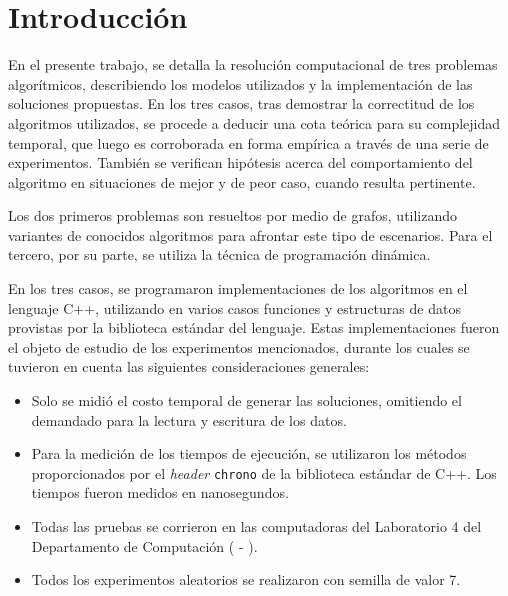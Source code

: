\section{Introducción}
    En el presente trabajo, se detalla la resolución computacional de tres
    problemas algorítmicos, describiendo los modelos utilizados y la
    implementación de las soluciones propuestas. En los tres casos, tras
    demostrar la correctitud de los algoritmos utilizados, se procede a
    deducir una cota teórica para su complejidad temporal, que luego es
    corroborada en forma empírica a través de una serie de experimentos.
    También se verifican hipótesis acerca del comportamiento del algoritmo
    en situaciones de mejor y de peor caso, cuando resulta pertinente.

    Los dos primeros problemas son resueltos por medio de grafos, utilizando
    variantes de conocidos algoritmos para afrontar este tipo de escenarios.
    Para el tercero, por su parte, se utiliza la técnica de programación
    dinámica.

    En los tres casos, se programaron implementaciones de los algoritmos
    en el lenguaje C++, utilizando en varios casos funciones y
    estructuras de datos provistas por la biblioteca estándar del lenguaje.
    Estas implementaciones fueron el objeto de estudio de los experimentos
    mencionados, durante los cuales se tuvieron en cuenta las siguientes
    consideraciones generales:

    \begin{itemize}
    \item Solo se midió el costo temporal de generar las soluciones,
    omitiendo el demandado para la lectura y escritura de los datos.
    \item Para la medición de los tiempos de ejecución, se utilizaron los
    métodos proporcionados por el \emph{header} \texttt{chrono} de la
    biblioteca estándar de C++. Los tiempos fueron medidos en nanosegundos.
    \item Todas las pruebas se corrieron en las computadoras del Laboratorio 4
    del Departamento de Computación ( - ).
    \item Todos los experimentos aleatorios se realizaron con semilla de valor 7.
    \end{itemize}
